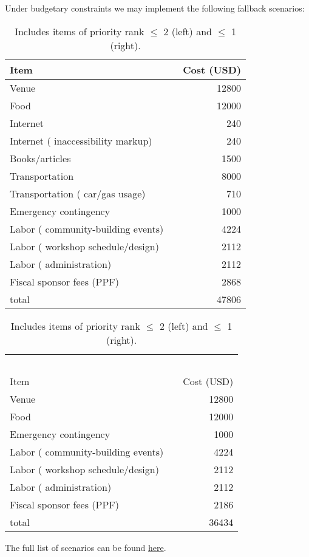 \documentclass[10pt]{article}
\begin{document}
Under budgetary constraints we may implement the following fallback scenarios:

\begin{table}[h]
\begin{tabular}{llr}
Item &  & Cost (USD) \\ \hline
Venue &  & 12800 \\
Food &  & 12000 \\
Internet &  & 240 \\
Internet ( inaccessibility markup) &  & 240 \\
Books/articles &  & 1500 \\
Transportation &  & 8000 \\
Transportation ( car/gas usage) &  & 710 \\
Emergency contingency &  & 1000 \\
Labor ( community-building events) &  & 4224 \\
Labor ( workshop schedule/design) &  & 2112 \\
Labor ( administration) &  & 2112 \\
Fiscal sponsor fees (PPF) &  & 2868 \\ \hline
total &  & 47806
\end{tabular}
\begin{tabular}{llr}
 &  & \\
 &  & \\
 &  & \\
 &  & \\
 &  & \\
Item & & Cost (USD) \\ \hline
Venue &  & 12800 \\
Food &  & 12000 \\
Emergency contingency &  & 1000 \\
Labor ( community-building events) &  & 4224 \\
Labor ( workshop schedule/design) &  & 2112 \\
Labor ( administration) &  & 2112 \\
Fiscal sponsor fees (PPF) &  & 2186 \\ \hline
total &  & 36434
\end{tabular}
\caption{Includes items of priority rank $\leq$ 2 (left) and $\leq$ 1 (right).}\label{caplab}
\end{table}

The full list of scenarios can be found \href{https://raw.githubusercontent.com/let-me-think/let-me-think.github.io/master/budget_2023/budget_projection.pdf}{here}.
\end{document}
